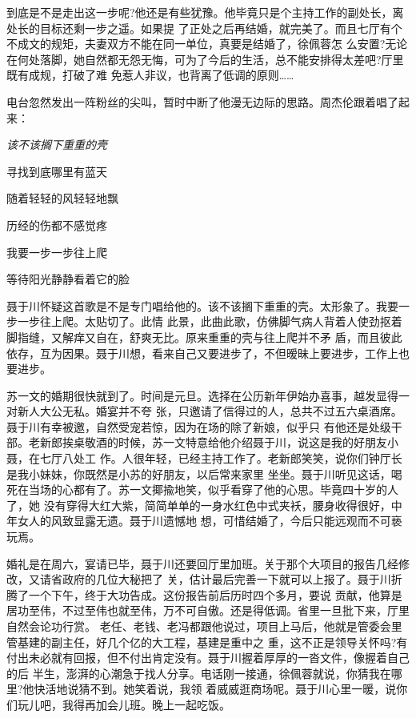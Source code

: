 \documentclass[11pt,a4paper,onecolumn]{article}
\begin{document}
到底是不是走出这一步呢?他还是有些犹豫。他毕竟只是个主持工作的副处长，离处长的目标还剩一步之遥。如果提
了正处之后再结婚，就完美了。而且七厅有个不成文的规矩，夫妻双方不能在同一单位，真要是结婚了，徐佩蓉怎
么安置?无论在何处落脚，她自然都无怨无悔，可为了今后的生活，总不能安排得太差吧?厅里既有成规，打破了难
免惹人非议，也背离了低调的原则……

电台忽然发出一阵粉丝的尖叫，暂时中断了他漫无边际的思路。周杰伦跟着唱了起来：

\begin{center}
{\itshape 该不该搁下重重的壳

寻找到底哪里有蓝天

随着轻轻的风轻轻地飘

历经的伤都不感觉疼

我要一步一步往上爬

等待阳光静静看着它的脸
}
\end{center}

聂于川怀疑这首歌是不是专门唱给他的。该不该搁下重重的壳。太形象了。我要一步一步往上爬。太贴切了。此情
此景，此曲此歌，仿佛脚气病人背着人使劲抠着脚指缝，又解痒又自在，舒爽无比。原来重重的壳与往上爬并不矛
盾，而且彼此依存，互为因果。聂于川想，看来自己又要进步了，不但暧昧上要进步，工作上也要进步。

苏一文的婚期很快就到了。时间是元旦。选择在公历新年伊始办喜事，越发显得一对新人大公无私。婚宴并不夸
张，只邀请了信得过的人，总共不过五六桌酒席。聂于川有幸被邀，自然受宠若惊，因为在场的除了新娘，似乎只
有他还是处级干部。老新郎挨桌敬酒的时候，苏一文特意给他介绍聂于川，说这是我的好朋友小聂，在七厅八处工
作。人很年轻，已经主持工作了。老新郎笑笑，说你们钟厅长是我小妹妹，你既然是小苏的好朋友，以后常来家里
坐坐。聂于川听见这话，喝死在当场的心都有了。苏一文揶揄地笑，似乎看穿了他的心思。毕竟四十岁的人了，她
没有穿得大红大紫，简简单单的一身水红色中式夹袄，腰身收得很好，中年女人的风致显露无遗。聂于川遗憾地
想，可惜结婚了，今后只能远观而不可亵玩焉。

婚礼是在周六，宴请已毕，聂于川还要回厅里加班。关于那个大项目的报告几经修改，又请省政府的几位大秘把了
关，估计最后完善一下就可以上报了。聂于川折腾了一个下午，终于大功告成。这份报告前后历时四个多月，要说
贡献，他算是居功至伟，不过至伟也就至伟，万不可自傲。还是得低调。省里一旦批下来，厅里自然会论功行赏。
老任、老钱、老冯都跟他说过，项目上马后，他就是管委会里管基建的副主任，好几个亿的大工程，基建是重中之
重，这不正是领导关怀吗?有付出未必就有回报，但不付出肯定没有。聂于川握着厚厚的一沓文件，像握着自己的后
半生，澎湃的心潮急于找人分享。电话刚一接通，徐佩蓉就说，你猜我在哪里?他快活地说猜不到。她笑着说，我领
着威威逛商场呢。聂于川心里一暖，说你们玩儿吧，我得再加会儿班。晚上一起吃饭。
\end{document}
